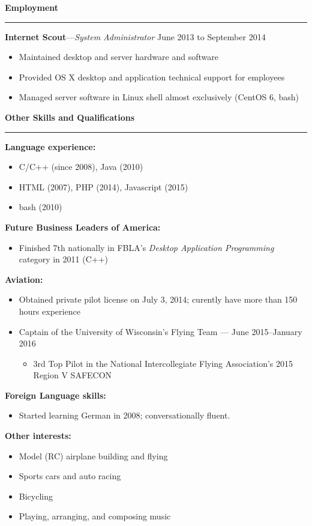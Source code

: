 \documentclass[12pt,letterpaper]{article}
\newenvironment{details}{
    \vspace{-.8em}
    \begin{itemize}
        \renewcommand \labelitemi{\labelitemiv}
        \setlength{\itemsep}{0pt}
        \setlength{\parskip}{-1pt}
        \setlength{\parsep}{0pt}
    }{
    \end{itemize}
    \vspace{-.5em}
}
\newcommand{\hr} {
    \vspace{-1em}
    \par\rule{\textwidth}{1pt}
    \vspace{-1.5em}
}
\newcommand{\ressection}[1] {
    \par{\large \textbf{#1}}
    \hr
}
\newenvironment{employment} {
    \setlength{\parskip}{0pt}
    \ressection{Employment}
}{
    \vspace{0.5em}
}
\newenvironment{other} {
    \ressection{Other Skills and Qualifications}
    \setlength{\parskip}{3pt}
}{
    \vspace{0.5em}
}
\newcommand{\employer}[3] {
    \vspace{3pt}
    {\par\textbf{#1}---\textit{#2} \hfill #3}
    \par
}
\begin{document}
\begin{employment}
\employer{Internet Scout}{System Administrator}{June 2013 to September 2014}
\begin{details}
    \item Maintained desktop and server hardware and software
    \item Provided OS X desktop and application technical support for employees
    \item Managed server software in Linux shell almost exclusively (CentOS 6, bash)
\end{details}

\end{employment}

\begin{other}
\par \textbf{Language experience:}
\begin{details}
    \item C/C++ (since 2008), Java (2010)
    \item HTML (2007), PHP (2014), Javascript (2015)
    \item bash (2010)
\end{details}
\par \textbf{Future Business Leaders of America:}
\begin{details}
    \item Finished 7th nationally in FBLA's \textit{Desktop Application Programming} category in 2011 (C++)
\end{details}

\par \textbf{Aviation:}
\begin{details}
    \item Obtained private pilot license on July 3, 2014; curently have more than 150 hours experience
    \item Captain of the University of Wisconsin's Flying Team --- June 2015--January 2016
    \vspace{.5em}
    \begin{details}
        \item 3rd Top Pilot in the National Intercollegiate Flying Association's 2015 Region V SAFECON
    \end{details}
\end{details}

\par \textbf{Foreign Language skills:}
\begin{details}
    \item Started learning German in 2008; conversationally fluent.
\end{details}

\par \textbf{Other interests:}
\begin{details}
    \item Model (RC) airplane building and flying
    \item Sports cars and auto racing
    \item Bicycling
    \item Playing, arranging, and composing music
\end{details}

\end{other}
\end{document}
